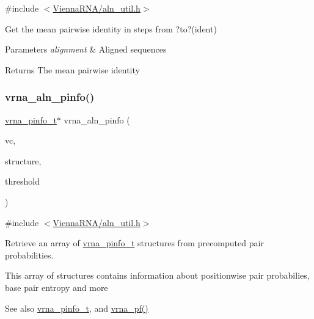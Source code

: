 {\ttfamily \#include $<$\mbox{\hyperlink{aln__util_8h}{Vienna\+R\+N\+A/aln\+\_\+util.\+h}}$>$}



Get the mean pairwise identity in steps from ?to?(ident) 


\begin{DoxyParams}{Parameters}
{\em alignment} & Aligned sequences \\
\hline
\end{DoxyParams}
\begin{DoxyReturn}{Returns}
The mean pairwise identity 
\end{DoxyReturn}
\mbox{\label{group__aln__utils_gaf6421a1318586c59fea6a127ed9f65f3}} 
\subsubsection{\texorpdfstring{vrna\+\_\+aln\+\_\+pinfo()}{vrna\_aln\_pinfo()}}
{\footnotesize\ttfamily \mbox{\hyperlink{group__aln__utils_ga6660dfca23debee7306e0cd53341263f}{vrna\+\_\+pinfo\+\_\+t}}$\ast$ vrna\+\_\+aln\+\_\+pinfo (\begin{DoxyParamCaption}\item[{\mbox{\hyperlink{group__fold__compound_ga1b0cef17fd40466cef5968eaeeff6166}{vrna\+\_\+fold\+\_\+compound\+\_\+t}} $\ast$}]{vc,  }\item[{const char $\ast$}]{structure,  }\item[{double}]{threshold }\end{DoxyParamCaption})}



{\ttfamily \#include $<$\mbox{\hyperlink{aln__util_8h}{Vienna\+R\+N\+A/aln\+\_\+util.\+h}}$>$}



Retrieve an array of \mbox{\hyperlink{group__aln__utils_ga6660dfca23debee7306e0cd53341263f}{vrna\+\_\+pinfo\+\_\+t}} structures from precomputed pair probabilities. 

This array of structures contains information about positionwise pair probabilies, base pair entropy and more

\begin{DoxySeeAlso}{See also}
\mbox{\hyperlink{group__aln__utils_ga6660dfca23debee7306e0cd53341263f}{vrna\+\_\+pinfo\+\_\+t}}, and \mbox{\hyperlink{group__pf__fold_ga29e256d688ad221b78d37f427e0e99bc}{vrna\+\_\+pf()}}
\end{DoxySeeAlso}

